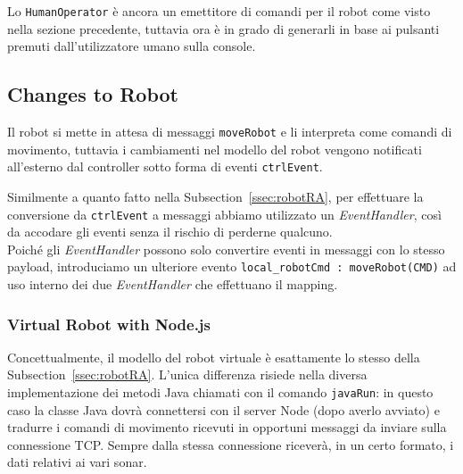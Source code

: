\documentclass{../llncs}
\newcommand{\codescript}[1]{{\mbox{\small{\texttt{#1}}}}\xspace}
\newcommand{\xss}[1]{\subsectionname~\ref{ssec:#1}}
\newcommand{\subsectionname}{Subsection}
\begin{document}
Lo \texttt{HumanOperator} è ancora un emettitore di comandi per il robot come visto nella sezione precedente, tuttavia ora è in grado di generarli in base ai pulsanti premuti dall'utilizzatore umano sulla console.\\



\subsection{Changes to Robot}
Il robot si mette in attesa di messaggi \codescript{moveRobot} e li interpreta come comandi di movimento, tuttavia i cambiamenti nel modello del robot vengono notificati all'esterno dal controller sotto forma di eventi \codescript{ctrlEvent}.

Similmente a quanto fatto nella \xss{robotRA}, per effettuare la conversione da \codescript{ctrlEvent} a messaggi abbiamo utilizzato un \emph{EventHandler}, così da accodare gli eventi senza il rischio di perderne qualcuno.\\ %



Poiché gli \emph{EventHandler} possono solo convertire eventi in messaggi con lo stesso payload, introduciamo un ulteriore evento \codescript{local\_robotCmd : moveRobot(CMD)} ad uso interno dei due \emph{EventHandler} che effettuano il mapping.

%

\subsubsection{Virtual Robot with Node.js}
Concettualmente, il modello del robot virtuale è esattamente lo stesso della \xss{robotRA}. L'unica differenza risiede nella diversa implementazione dei metodi Java chiamati con il comando \codescript{javaRun}: in questo caso la classe Java dovrà connettersi con il server Node (dopo averlo avviato) e tradurre i comandi di movimento ricevuti in opportuni messaggi da inviare sulla connessione TCP. Sempre dalla stessa connessione riceverà, in un certo formato, i dati relativi ai vari sonar.
\end{document}
